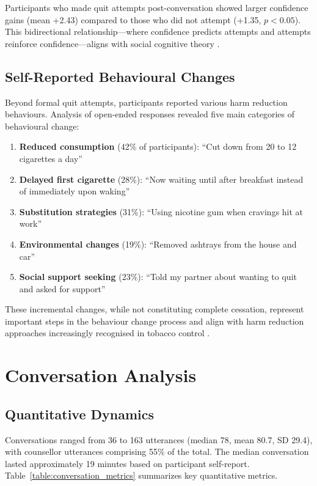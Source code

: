 Participants who made quit attempts post-conversation showed larger confidence gains (mean +2.43) compared to those who did not attempt (+1.35, $p<0.05$). This bidirectional relationship---where confidence predicts attempts and attempts reinforce confidence---aligns with social cognitive theory \citep{Bandura1986}.

\subsection{Self-Reported Behavioural Changes}

Beyond formal quit attempts, participants reported various harm reduction behaviours. Analysis of open-ended responses revealed five main categories of behavioural change:

\begin{enumerate}
\item \textbf{Reduced consumption} (42\% of participants): ``Cut down from 20 to 12 cigarettes a day''
\item \textbf{Delayed first cigarette} (28\%): ``Now waiting until after breakfast instead of immediately upon waking''
\item \textbf{Substitution strategies} (31\%): ``Using nicotine gum when cravings hit at work''
\item \textbf{Environmental changes} (19\%): ``Removed ashtrays from the house and car''
\item \textbf{Social support seeking} (23\%): ``Told my partner about wanting to quit and asked for support''
\end{enumerate}

These incremental changes, while not constituting complete cessation, represent important steps in the behaviour change process and align with harm reduction approaches increasingly recognised in tobacco control \citep{Abrams2018}.

\section{Conversation Analysis}
\label{sec:conversation-analysis}

\subsection{Quantitative Dynamics}

Conversations ranged from 36 to 163 utterances (median 78, mean 80.7, SD 29.4), with counsellor utterances comprising 55\% of the total. The median conversation lasted approximately 19 minutes based on participant self-report. Table~\ref{table:conversation_metrics} summarizes key quantitative metrics.

